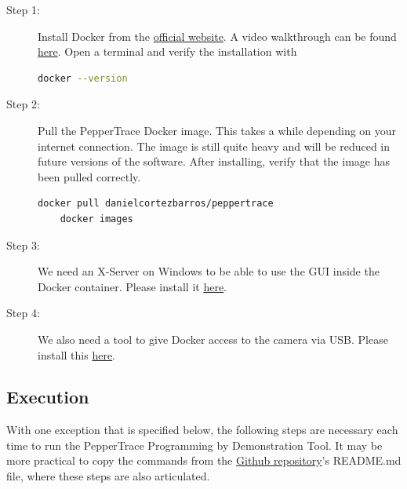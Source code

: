 \documentclass{CSSRforAfrica}
\begin{document}
\begin{description}
    \item[Step 1:] Install Docker from the \href{https://docs.docker.com/desktop/setup/install/windows-install/}{official website}. A video walkthrough can be found \href{https://www.youtube.com/watch?v=WDEdRmTCSs8}{here}. Open a terminal and verify the installation with 
        \begin{lstlisting}[style=withoutNumbering, language=bash]
    docker --version
        \end{lstlisting}
    \item[Step 2:] Pull the PepperTrace Docker image. This takes a while depending on your internet connection. The image is still quite heavy and will be reduced in future versions of the software. After installing, verify that the image has been pulled correctly.
        \begin{lstlisting}[style=withoutNumbering, language=bash]
    docker pull danielcortezbarros/peppertrace
    docker images
        \end{lstlisting}
    \item[Step 3:] We need an X-Server on Windows to be able to use the GUI inside the Docker container. Please install it \href{https://sourceforge.net/projects/vcxsrv/}{here}. 
    \item[Step 4:] We also need a tool to give Docker access to the camera via USB. Please install this \href{https://github.com/dorssel/usbipd-win/releases/tag/v4.3.0}{here}.
        
\end{description}


\subsection*{Execution}
With one exception that is specified below, the following steps are necessary each time to run the PepperTrace Programming by Demonstration Tool. It may be more practical to copy the commands from the \href{https://github.com/danielcortezbarros/peppertrace}{Github repository}'s README.md file, where these steps are also articulated. 
\end{document}
